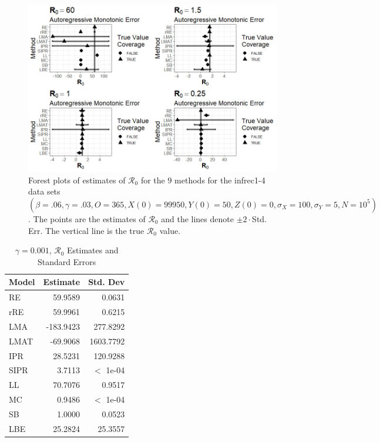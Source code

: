 \documentclass[12pt]{article}
\newcommand{\xxsir}{\ensuremath{9} } %
\newcommand{\rr}{\ensuremath{\mathcal{R}_0}}
\begin{document}
\begin{figure}[H]
	\centering
	\includegraphics[scale=0.5]{images/parchange_arm.jpg}
	\caption{Forest plots of estimates of $\rr$ for the \xxsir methods for the infrec1-4 data sets $(\beta=.06, \gamma=.03, O=365, X(0)=99950, Y(0)=50, Z(0)=0, \sigma_X=100, \sigma_Y=5, N=10^5)$.  The points are the estimates of $\rr$ and the lines denote $\pm 2\cdot $Std. Err.  The vertical line is the true $\rr$ value.}
\end{figure}
\begin{table}[H]
	
	\centering
	\begin{tabular}[t]{l|r|r}
		\hline
		Model & Estimate & Std. Dev\\
		\hline
		RE & 59.9589 & 0.0631\\
		\hline
		rRE & 59.9961 & 0.6215\\
		\hline
		LMA & -183.9423 & 277.8292\\
		\hline
		LMAT & -69.9068 & 1603.7792\\
		\hline
		IPR & 28.5231 & 120.9288\\
		\hline
		SIPR & 3.7113 & $<$ 1e-04\\
		\hline
		LL & 70.7076 & 0.9517\\
		\hline
		MC & 0.9486 & $<$ 1e-04\\
		\hline
		SB & 1.0000 & 0.0523\\
		\hline
		LBE & 25.2824 & 25.3557\\
		\hline
	\end{tabular}
	\caption{$\gamma = 0.001$, $\rr$ Estimates and Standard Errors}
\end{table}
\end{document}
